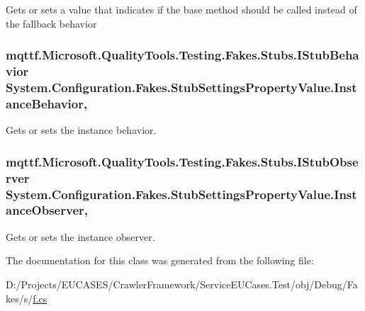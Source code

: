 Gets or sets a value that indicates if the base method should be called instead of the fallback behavior

\hypertarget{class_system_1_1_configuration_1_1_fakes_1_1_stub_settings_property_value_a023a25ae1c4643782f1123f193727f22}{
\subsubsection[{Instance\-Behavior}]{\setlength{\rightskip}{0pt plus 5cm}mqttf.\-Microsoft.\-Quality\-Tools.\-Testing.\-Fakes.\-Stubs.\-I\-Stub\-Behavior System.\-Configuration.\-Fakes.\-Stub\-Settings\-Property\-Value.\-Instance\-Behavior\hspace{0.3cm}{\ttfamily [get]}, {\ttfamily [set]}}}\label{class_system_1_1_configuration_1_1_fakes_1_1_stub_settings_property_value_a023a25ae1c4643782f1123f193727f22}


Gets or sets the instance behavior.

\hypertarget{class_system_1_1_configuration_1_1_fakes_1_1_stub_settings_property_value_a04ddf4420e901f00fd6ba761b6a0270d}{
\subsubsection[{Instance\-Observer}]{\setlength{\rightskip}{0pt plus 5cm}mqttf.\-Microsoft.\-Quality\-Tools.\-Testing.\-Fakes.\-Stubs.\-I\-Stub\-Observer System.\-Configuration.\-Fakes.\-Stub\-Settings\-Property\-Value.\-Instance\-Observer\hspace{0.3cm}{\ttfamily [get]}, {\ttfamily [set]}}}\label{class_system_1_1_configuration_1_1_fakes_1_1_stub_settings_property_value_a04ddf4420e901f00fd6ba761b6a0270d}


Gets or sets the instance observer.



The documentation for this class was generated from the following file\-:\begin{DoxyCompactItemize}
\item 
D\-:/\-Projects/\-E\-U\-C\-A\-S\-E\-S/\-Crawler\-Framework/\-Service\-E\-U\-Cases.\-Test/obj/\-Debug/\-Fakes/s/\hyperlink{s_2f_8cs}{f.\-cs}\end{DoxyCompactItemize}
